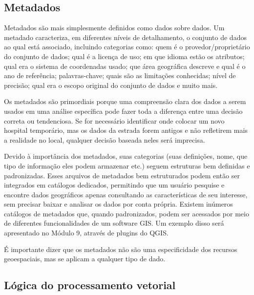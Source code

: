 \documentclass[
]{book}
\begin{document}
\hypertarget{metadados}{%
\subsection{Metadados}\label{metadados}}

Metadados são mais simplesmente definidos como dados sobre dados. Um metadado caracteriza, em diferentes níveis de detalhamento, o conjunto de dados ao qual está associado, incluindo categorias como: quem é o provedor/proprietário do conjunto de dados; qual é a licença de uso; em que idioma estão os atributos; qual era o sistema de coordenadas usado; que área geográfica descreve e qual é o ano de referência; palavras-chave; quais são as limitações conhecidas; nível de precisão; qual era o escopo original do conjunto de dados e muito mais.

Os metadados são primordiais porque uma compreensão clara dos dados a serem usados \hspace{0pt}\hspace{0pt}em uma análise específica pode fazer toda a diferença entre uma decisão correta ou tendenciosa. Se for necessário identificar onde colocar um novo hospital temporário, mas os dados da estrada forem antigos e não refletirem mais a realidade no local, qualquer decisão baseada neles será imprecisa.

Devido à importância dos metadados, suas categorias (suas definições, nome, que tipo de informação eles podem armazenar etc.) seguem estruturas bem definidas e padronizadas. Esses arquivos de metadados bem estruturados podem então ser integrados em catálogos dedicados, permitindo que um usuário pesquise e encontre dados geográficos apenas consultando as características de seu interesse, sem precisar baixar e analisar os dados por conta própria. Existem inúmeros catálogos de metadados que, quando padronizados, podem ser acessados \hspace{0pt}\hspace{0pt}por meio de diferentes funcionalidades de um software GIS. Um exemplo disso será apresentado no Módulo 9, através de plugins do QGIS.

É importante dizer que os metadados não são uma especificidade dos recursos geoespaciais, mas se aplicam a qualquer tipo de dado.

\hypertarget{luxf3gica-do-processamento-vetorial}{%
\subsection{Lógica do processamento vetorial}\label{luxf3gica-do-processamento-vetorial}}
\end{document}

